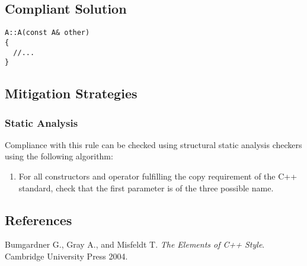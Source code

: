 \subsection{Compliant Solution}

\begin{verbatim}
A::A(const A& other)
{
  //...
}
\end{verbatim}

\subsection{Mitigation Strategies}
\subsubsection{Static Analysis}

Compliance with this rule can be checked using structural static
analysis checkers using the following algorithm:

\begin{enumerate}
\item  For all constructors and operator fulfilling the
copy requirement of the C++ standard, check that the first parameter is
of the three possible name.
\end{enumerate}

\subsection{References}

Bumgardner G., Gray A., and Misfeldt T. {\it The Elements of C++
Style}. Cambridge University Press 2004.

